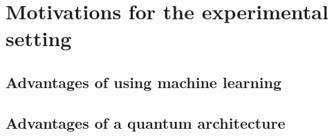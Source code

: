 \chapter{Motivations for the experimental setting}
\section{Advantages of using machine learning}
\section{Advantages of a quantum architecture}